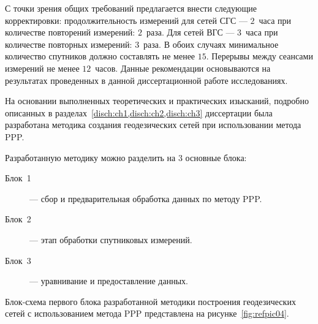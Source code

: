 С точки зрения общих требований предлагается внести следующие корректировки: продолжительность измерений для сетей СГС --- $2$~часа при количестве повторений измерений: $2$~раза. Для сетей ВГС --- $3$~часа при количестве повторных измерений: $3$~раза. В обоих случаях минимальное количество спутников должно составлять не менее $15$. Перерывы между сеансами измерений не менее $12$~часов. Данные рекомендации основываются на результатах проведенных в данной диссертационной работе исследованиях.

На основании выполненных теоретических и практических изысканий, подробно описанных в разделах~\cref*{disch:ch1,disch:ch2,disch:ch3} диссертации была разработана методика создания геодезических сетей при использовании метода PPP.

Разработанную методику можно разделить на 3 основные блока:
\begin{description}
	\item[Блок~1] --- сбор и предварительная обработка данных по методу PPP.
	\item[Блок~2] --- этап обработки спутниковых измерений.
	\item[Блок~3] --- уравнивание и предоставление данных.
\end{description}

Блок-схема первого блока разработанной методики построения геодезических сетей с использованием метода PPP представлена на рисунке~\cref{fig:refpic04}.


